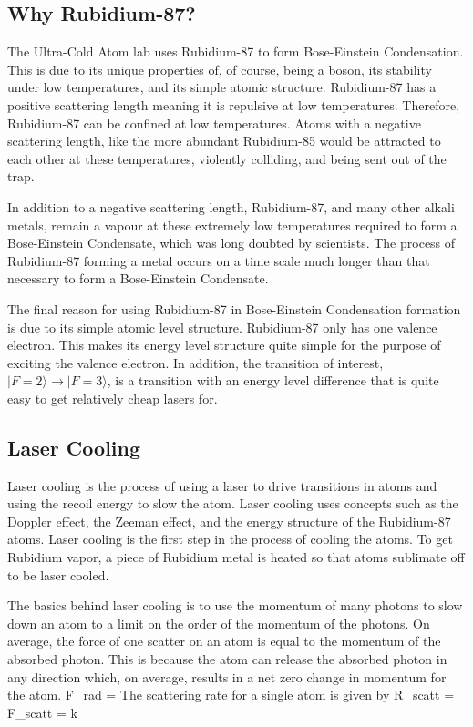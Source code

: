 \subsection{Why Rubidium-87?} 

The Ultra-Cold Atom lab uses Rubidium-87 to form Bose-Einstein Condensation. This is due to its unique properties of, of course, being a boson, its stability under low temperatures, and its simple atomic structure. Rubidium-87 has a positive scattering length meaning it is repulsive at low temperatures. Therefore, Rubidium-87 can be confined at low temperatures. Atoms with a negative scattering length, like the more abundant Rubidium-85 would be attracted to each other at these temperatures, violently colliding, and being sent out of the trap. 


In addition to a negative scattering length, Rubidium-87, and many other alkali metals, remain a vapour at these extremely low temperatures required to form a Bose-Einstein Condensate, which was long doubted by scientists. The process of Rubidium-87 forming a metal occurs on a time scale much longer than that necessary to form a Bose-Einstein Condensate. 


The final reason for using Rubidium-87 in Bose-Einstein Condensation formation is due to its simple atomic level structure. Rubidium-87 only has one valence electron. This makes its energy level structure quite simple for the purpose of exciting the valence electron. In addition, the transition of interest, $| F=2\rangle \rightarrow | F=3\rangle$, is a transition with an energy level difference that is quite easy to get relatively cheap lasers for. 


\subsection{Laser Cooling}

Laser cooling is the process of using a laser to drive transitions in atoms and using the recoil energy to slow the atom. Laser cooling uses concepts such as the Doppler effect, the Zeeman effect, and the energy structure of the Rubidium-87 atoms. Laser cooling is the first step in the process of cooling the atoms. To get Rubidium vapor, a piece of Rubidium metal is heated so that atoms sublimate off to be laser cooled. 

The basics behind laser cooling is to use the momentum of many photons to slow down an atom to a limit on the order of the momentum of the photons. On average, the force of one scatter on an atom is equal to the momentum of the absorbed photon. This is because the atom can release the absorbed photon in any direction which, on average, results in a net zero change in momentum for the atom.
\beq
F_{rad} = 
\eeq
The scattering rate for a single atom is given by 
\beq
R_{scatt} =   
\eeq
\beq 
F_{scatt} = \hbar k    
\eeq

